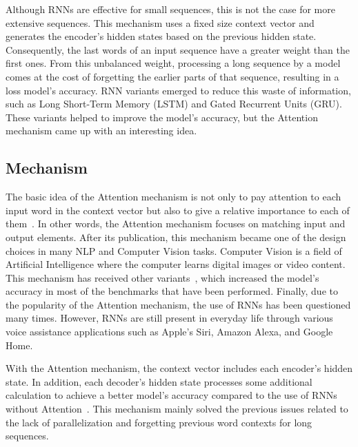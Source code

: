 Although RNNs are effective for small sequences, this is not the case for more
extensive sequences. This mechanism uses a fixed size context vector and
generates the encoder's hidden states based on the previous hidden
state. Consequently, the last words of an input sequence have a greater weight
than the first ones. From this unbalanced weight, processing a long sequence by
a model comes at the cost of forgetting the earlier parts of that sequence,
resulting in a loss model's accuracy. RNN variants emerged to reduce this waste
of information, such as Long Short-Term Memory (LSTM) and Gated Recurrent Units
(GRU). These variants helped to improve the model's accuracy, but the Attention
mechanism came up with an interesting idea.

\subsection{Mechanism}
\label{subsec:attention:mechanism}

The basic idea of the Attention mechanism is not only to pay attention to each
input word in the context vector but also to give a relative importance to each
of them~\citep{bahdanau}. In other words, the Attention mechanism focuses on
matching input and output elements. After its publication, this mechanism became
one of the design choices in many NLP and Computer Vision tasks. Computer Vision
is a field of Artificial Intelligence where the computer learns digital images
or video content. This mechanism has received other
variants~\citep{DBLP:conf/emnlp/LuongPM15}, which increased the model's accuracy
in most of the benchmarks that have been performed. Finally, due to the
popularity of the Attention mechanism, the use of RNNs has been questioned many
times. However, RNNs are still present in everyday life through various voice
assistance applications such as Apple's Siri, Amazon Alexa, and Google Home.

With the Attention mechanism, the context vector includes each encoder's hidden
state. In addition, each decoder's hidden state processes some additional
calculation to achieve a better model's accuracy compared to the use of RNNs
without Attention~\citep{alammar-seq2seq}. This mechanism mainly solved the
previous issues related to the lack of parallelization and forgetting previous
word contexts for long sequences.


\newpage

